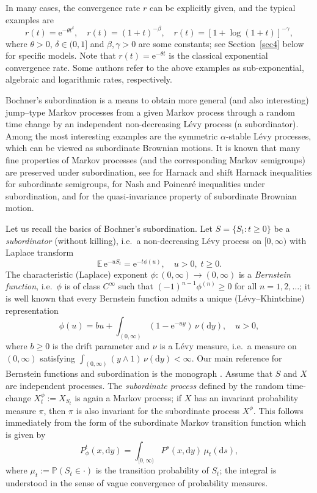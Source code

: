 \documentclass{aptpub}
\newcommand\EE{\mathds E}
\newcommand\Prob{\mathds P}
\newcommand\dup{\mathrm{d}}
\newcommand\eup{\mathrm{e}}                                %
\numberwithin{equation}{section}
\begin{document}
In many cases, the convergence rate $r$ can be explicitly
given, and the typical examples are
\begin{equation}\label{typical}
    r(t)=\eup^{-\theta t^\delta},\quad
    r(t)=(1+t)^{-\beta},\quad
    r(t)=\left[1+\log(1+t)\right]^{-\gamma},
\end{equation}
where $\theta>0$, $\delta\in(0,1]$ and $\beta,\gamma>0$ are some constants; see Section~\ref{sec4} below for specific models. Note that $r(t)=\eup^{-\theta t}$ is the classical exponential convergence rate. Some authors refer to the above examples as  sub-exponential, algebraic and logarithmic rates, respectively.


Bochner's subordination is a means to obtain more general (and also interesting) jump--type Markov processes from a given Markov process through a random time change by an independent non-decreasing L\'evy process (a subordinator). Among the most interesting examples are the symmetric $\alpha$-stable L\'{e}vy processes, which can be
viewed as subordinate Brownian motions. It is known that many fine properties of Markov processes (and the corresponding Markov semigroups) are preserved under subordination, see \cite{GRW11, DS15b} for Harnack and shift Harnack inequalities for subordinate semigroups, \cite{SW12, GM15} for Nash and Poincar\'{e} inequalities under subordination, and \cite{DS15a} for the quasi-invariance property of subordinate Brownian motion.


Let us recall the basics of Bochner's subordination. Let $S=\{S_t:t\geq0\}$ be a \emph{subordinator} (without killing), i.e.\ a non-decreasing L\'{e}vy process on $[0,\infty)$ with Laplace transform
$$
    \EE\,\eup^{-uS_t}=\eup^{-t\phi(u)},\quad u>0,\;t\geq0.
$$
The characteristic (Laplace) exponent $\phi:(0,\infty)\to (0,\infty)$ is a \emph{Bernstein function}, i.e.\ $\phi$ is of class $C^\infty$ such that $(-1)^{n-1}\phi^{(n)}\geq 0$ for all $n=1,2,\dots$; it is well known that every Bernstein function admits a unique (L\'evy--Khintchine) representation
\begin{equation}\label{bern-rep}
    \phi(u)=bu+\int_{(0,\infty)}\left(1-\eup^{-uy}\right)
    \,\nu(\dup y),\quad u>0,
\end{equation}
where $b\geq0$ is the drift parameter and $\nu$ is a L\'{e}vy measure, i.e.\ a measure on $(0,\infty)$ satisfying $\int_{(0,\infty)}(y\wedge1)\,\nu(\dup y)<\infty$. Our main reference for Bernstein functions and subordination is the monograph \cite{SSV12}. Assume that $S$ and $X$ are independent processes. The \emph{subordinate process} defined by the random time-change
$X_t^\phi:=X_{S_t}$ is again a Markov process; if $X$ has an invariant probability measure $\pi$, then $\pi$ is also invariant for the subordinate process $X^\phi$. This follows immediately from the form of the subordinate Markov transition function which is given by
$$
    P^t_\phi(x,\dup y)=\int_{[0,\infty)}
    P^s(x,\dup y)\,\mu_t(\dup s),
$$
where $\mu_t:=\Prob(S_t\in\cdot)$ is the transition probability of $S_t$; the integral is understood in the sense of vague convergence of probability measures.
\end{document}
